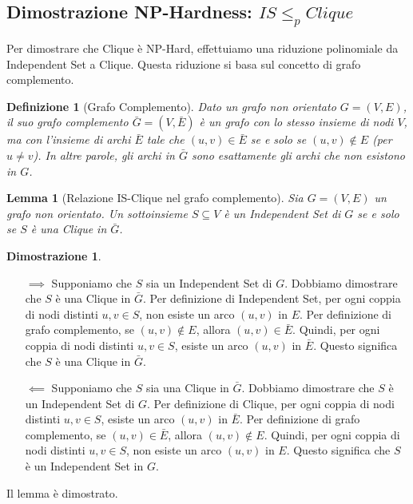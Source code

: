 \documentclass[a4paper]{article}
\newtheorem{definition}{Definizione}[section]
\newtheorem{lemma}{Lemma}[section]
\theoremstyle{definition} %
\newtheorem*{proof*}{Dimostrazione}
\begin{document}
\subsection{Dimostrazione NP-Hardness: $IS \le_p Clique$}

Per dimostrare che Clique è NP-Hard, effettuiamo una riduzione polinomiale da Independent Set a Clique. Questa riduzione si basa sul concetto di grafo complemento.

\begin{definition}[Grafo Complemento]
Dato un grafo non orientato $G=(V, E)$, il suo \emph{grafo complemento} $\bar{G}=(V, \bar{E})$ è un grafo con lo stesso insieme di nodi $V$, ma con l'insieme di archi $\bar{E}$ tale che $(u, v) \in \bar{E}$ se e solo se $(u, v) \notin E$ (per $u \ne v$). In altre parole, gli archi in $\bar{G}$ sono esattamente gli archi che non esistono in $G$.
\end{definition}

\begin{lemma}[Relazione IS-Clique nel grafo complemento]
Sia $G=(V, E)$ un grafo non orientato. Un sottoinsieme $S \subseteq V$ è un Independent Set di $G$ se e solo se $S$ è una Clique in $\bar{G}$.
\end{lemma}

\begin{proof*}
\begin{itemize}
    \item[$\implies$] Supponiamo che $S$ sia un Independent Set di $G$.
    Dobbiamo dimostrare che $S$ è una Clique in $\bar{G}$.
    Per definizione di Independent Set, per ogni coppia di nodi distinti $u, v \in S$, non esiste un arco $(u, v)$ in $E$.
    Per definizione di grafo complemento, se $(u, v) \notin E$, allora $(u, v) \in \bar{E}$.
    Quindi, per ogni coppia di nodi distinti $u, v \in S$, esiste un arco $(u, v)$ in $\bar{E}$. Questo significa che $S$ è una Clique in $\bar{G}$.

    \item[$\impliedby$] Supponiamo che $S$ sia una Clique in $\bar{G}$.
    Dobbiamo dimostrare che $S$ è un Independent Set di $G$.
    Per definizione di Clique, per ogni coppia di nodi distinti $u, v \in S$, esiste un arco $(u, v)$ in $\bar{E}$.
    Per definizione di grafo complemento, se $(u, v) \in \bar{E}$, allora $(u, v) \notin E$.
    Quindi, per ogni coppia di nodi distinti $u, v \in S$, non esiste un arco $(u, v)$ in $E$. Questo significa che $S$ è un Independent Set in $G$.
\end{itemize}
Il lemma è dimostrato.
\end{proof*}
\end{document}
